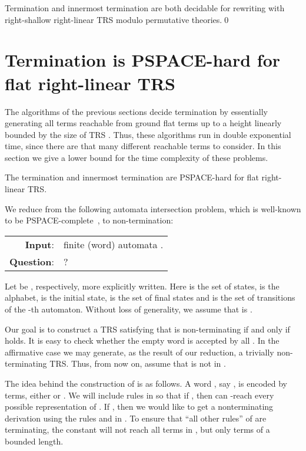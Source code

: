 \documentclass{LMCS}
\theoremstyle{plain}
\begin{document}
\begin{thm}
Termination and innermost termination are both
decidable for rewriting with right-shallow right-linear TRS 
modulo permutative theories.\qed
\end{thm}

\section{Termination is PSPACE-hard for flat right-linear TRS}\label{sec-hardness}

\noindent The algorithms of the previous sections decide termination by 
essentially generating
all terms reachable from ground flat terms up to a height
linearly bounded by the size of TRS . Thus, these algorithms
run in double exponential time, since there are that
many different reachable terms to consider. In this section
we give a lower bound for the time complexity of
these problems.

\begin{thm}
The termination and innermost termination are PSPACE-hard for
flat right-linear TRS.
\end{thm}
\proof
We reduce from the following automata intersection
problem, which is
well-known to be PSPACE-complete~\cite{Kozen77}, to non-termination:
\\
\begin{tabular}{rl}
{\bf Input}: &  finite (word) automata .\\
{\bf Question}: & ?
\end{tabular}

Let  be ,
respectively, more explicitly written. 
Here 
 is the set of states,
 is the alphabet,
 is the initial state,
 is the set of final states and
 is the set of transitions of the -th automaton.
Without loss of generality, we assume that  is .

Our goal is to construct a TRS  satisfying that
 is non-terminating if and only if
 holds.
It is easy to check whether the empty word  is
accepted by all . In the affirmative case we may generate,
as the result of our reduction, a trivially non-terminating TRS.
Thus, from now on, assume that  is not in
.

The idea behind the construction of  is as follows.
A word , say , is encoded by terms, either
 or .
We will include rules in  so that if ,
then  can -reach every possible representation of .
If 
,
then we would like to get a nonterminating derivation
 using the rules
 and 
 in .
To ensure that ``all other rules'' of  are terminating,
the constant  will not reach all terms in , but
only terms of a bounded length.
\end{document}
